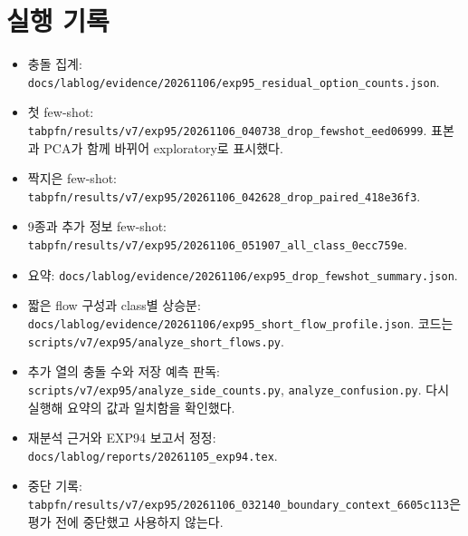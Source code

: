 \section{실행 기록}
\begin{itemize}
\item 충돌 집계: \texttt{docs/lablog/evidence/20261106/exp95\_residual\_option\_counts.json}.
\item 첫 few-shot: \texttt{tabpfn/results/v7/exp95/20261106\_040738\_drop\_fewshot\_eed06999}. 표본과 PCA가 함께 바뀌어 exploratory로 표시했다.
\item 짝지은 few-shot: \texttt{tabpfn/results/v7/exp95/20261106\_042628\_drop\_paired\_418e36f3}.
\item 9종과 추가 정보 few-shot: \texttt{tabpfn/results/v7/exp95/20261106\_051907\_all\_class\_0ecc759e}.
\item 요약: \texttt{docs/lablog/evidence/20261106/exp95\_drop\_fewshot\_summary.json}.
\item 짧은 flow 구성과 class별 상승분: \texttt{docs/lablog/evidence/20261106/exp95\_short\_flow\_profile.json}. 코드는 \texttt{scripts/v7/exp95/analyze\_short\_flows.py}.
\item 추가 열의 충돌 수와 저장 예측 판독: \texttt{scripts/v7/exp95/analyze\_side\_counts.py}, \texttt{analyze\_confusion.py}. 다시 실행해 요약의 값과 일치함을 확인했다.
\item 재분석 근거와 EXP94 보고서 정정: \texttt{docs/lablog/reports/20261105\_exp94.tex}.
\item 중단 기록: \texttt{tabpfn/results/v7/exp95/20261106\_032140\_boundary\_context\_6605c113}은 평가 전에 중단했고 사용하지 않는다.
\end{itemize}

